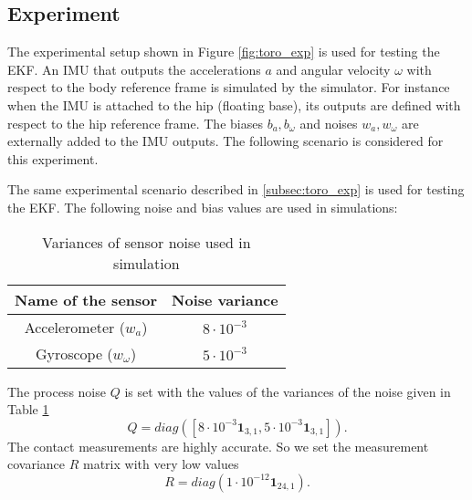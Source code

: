 \subsection{Experiment}
\begin{comment}
\begin{figure}

\caption{Experimental setup for the simple model}
\end{figure}
\end{comment}

The experimental setup shown in Figure \ref{fig:toro_exp} is used for testing the EKF. An IMU that outputs the accelerations $a$ and angular velocity $\omega$ with respect to the body reference frame is simulated by the simulator. For instance when the IMU is attached to the hip (floating base), its outputs are defined with respect to the hip reference frame. The biases $b_a,b_\omega$ and noises $w_a,w_\omega$ are externally added to the IMU outputs. The following scenario is considered for this experiment. 

The same experimental scenario described in \ref{subsec:toro_exp} is used for testing the EKF. The following noise and bias values are used in simulations:

\begin{table}
	\centering
	\begin{tabular}{|c|c|}
	\hline
	Name of the sensor &Noise variance \\ \hline
	Accelerometer ($w_a$) & $8 \cdot {10}^{-3}$ \\
	Gyroscope ($w_\omega$) & $5 \cdot {10}^{-3}$ \\ \hline	
	\end{tabular}
	\caption{Variances of sensor noise used in simulation}
	\label{tab:simp_noise}
\end{table}

The process noise $Q$ is set with the values of the variances of the noise given in Table \ref{tab:simp_noise} $$ Q = diag([ 8 \cdot {10}^{-3} \textbf{1}_{3,1}, 5 \cdot {10}^{-3} \textbf{1}_{3,1}]). $$
The contact measurements are highly accurate. So we set the measurement covariance $R$ matrix with very low values $$R = diag(1 \cdot {10}^{-12} \textbf{1}_{24,1}).$$
